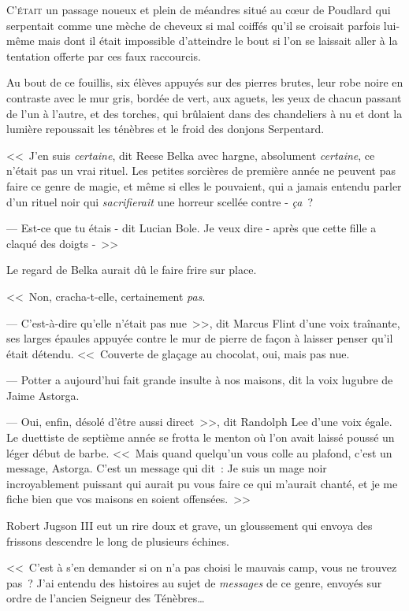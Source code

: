 
\lettrine{C}{'était} un passage noueux et plein de méandres situé au cœur de Poudlard qui serpentait comme une mèche de cheveux si mal coiffés qu'il se croisait parfois lui-même mais dont il était impossible d'atteindre le bout si l'on se laissait aller à la tentation offerte par ces faux raccourcis.

Au bout de ce fouillis, six élèves appuyés sur des pierres brutes, leur robe noire en contraste avec le mur gris, bordée de vert, aux aguets, les yeux de chacun passant de l'un à l'autre, et des torches, qui brûlaient dans des chandeliers à nu et dont la lumière repoussait les ténèbres et le froid des donjons Serpentard.

<<~J'en suis \emph{certaine}, dit Reese Belka avec hargne, absolument \emph{certaine}, ce n'était pas un vrai rituel. Les petites sorcières de première année ne peuvent pas faire ce genre de magie, et même si elles le pouvaient, qui a jamais entendu parler d'un rituel noir qui \emph{sacrifierait} une horreur scellée contre - \emph{ça}~?

--- Est-ce que tu étais - dit Lucian Bole. Je veux dire - après que cette fille a claqué des doigts -~>>

Le regard de Belka aurait dû le faire frire sur place.

<<~Non, cracha-t-elle, certainement \emph{pas}.

--- C'est-à-dire qu'elle n'était pas nue~>>, dit Marcus Flint d'une voix traînante, ses larges épaules appuyée contre le mur de pierre de façon à laisser penser qu'il était détendu. <<~Couverte de glaçage au chocolat, oui, mais pas nue.

--- Potter a aujourd'hui fait grande insulte à nos maisons, dit la voix lugubre de Jaime Astorga.

--- Oui, enfin, désolé d'être aussi direct~>>, dit Randolph Lee d'une voix égale. Le duettiste de septième année se frotta le menton où l'on avait laissé poussé un léger début de barbe. <<~Mais quand quelqu'un vous colle au plafond, c'est un message, Astorga. C'est un message qui dit~: Je suis un mage noir incroyablement puissant qui aurait pu vous faire ce qui m'aurait chanté, et je me fiche bien que vos maisons en soient offensées.~>>

Robert Jugson III eut un rire doux et grave, un gloussement qui envoya des frissons descendre le long de plusieurs échines.

<<~C'est à s'en demander si on n'a pas choisi le mauvais camp, vous ne trouvez pas~? J'ai entendu des histoires au sujet de \emph{messages} de ce genre, envoyés sur ordre de l'ancien Seigneur des Ténèbres…

